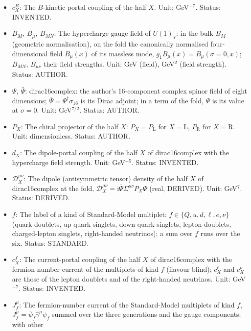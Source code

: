 \documentclass[
  10pt,
]{article}
\begin{document}
\begin{itemize}
  a repeated index is summed. Status: STANDARD.
\item
  \(c^{B}_X\): The \(B\)-kinetic portal coupling of the half \(X\).
  Unit: GeV\(^{-7}\). Status: INVENTED.
\item
  \(B_M,\ B_\mu,\ B_{MN}\): The hypercharge gauge field of \(U(1)_Y\):
  in the bulk \(B_M\) (geometric normalisation), on the fold the
  canonically normalised four-dimensional field \(B_\mu(x)\) of its
  massless mode, \(g_1B_\mu(x) = B_\mu(\sigma = 0, x)\); \(B_{MN}\),
  \(B_{\mu\nu}\) their field strengths. Unit: GeV (field), GeV\(^2\)
  (field strength). Status: AUTHOR.
\item
  \(\Psi,\ \bar\Psi\): dirac16complex: the author's 16-component complex
  spinor field of eight dimensions;
  \(\bar\Psi = \Psi^\dagger\sigma_{16}\) is its Dirac adjoint; in a term
  of the fold, \(\Psi\) is its value at \(\sigma = 0\). Unit:
  GeV\(^{7/2}\). Status: AUTHOR.
\item
  \(P_X\): The chiral projector of the half \(X\):
  \(P_X = P_{\mathrm{L}}\) for \(X = \mathrm{L}\), \(P_{\mathrm{R}}\)
  for \(X = \mathrm{R}\). Unit: dimensionless. Status: AUTHOR.
\item
  \(d_X\): The dipole-portal coupling of the half \(X\) of
  dirac16complex with the hypercharge field strength. Unit:
  GeV\(^{-5}\). Status: INVENTED.
\item
  \(\mathcal{D}_X^{\mu\nu}\): The dipole (antisymmetric tensor) density
  of the half \(X\) of dirac16complex at the fold,
  \(\mathcal{D}_X^{\mu\nu} = \mathrm{i}\bar\Psi\Sigma^{\mu\nu}P_X\Psi\)
  (real, DERIVED). Unit: GeV\(^7\). Status: DERIVED.
\item
  \(f\): The label of a kind of Standard-Model multiplet:
  \(f \in \{Q, u, d, \ell, e, \nu\}\) (quark doublets, up-quark
  singlets, down-quark singlets, lepton doublets, charged-lepton
  singlets, right-handed neutrinos); a sum over \(f\) runs over the six.
  Status: STANDARD.
\item
  \(c^{f}_X\): The current-portal coupling of the half \(X\) of
  dirac16complex with the fermion-number current of the multiplets of
  kind \(f\) (flavour blind); \(c^{\ell}_X\) and \(c^{\nu}_X\) are those
  of the lepton doublets and of the right-handed neutrinos. Unit:
  GeV\(^{-7}\). Status: INVENTED.
\item
  \(J_f^\mu\): The fermion-number current of the Standard-Model
  multiplets of kind \(f\), \(J_f^\mu = \bar\psi_f\hat\gamma^\mu\psi_f\)
  summed over the three generations and the gauge components; with other

\end{itemize}
\end{document}
